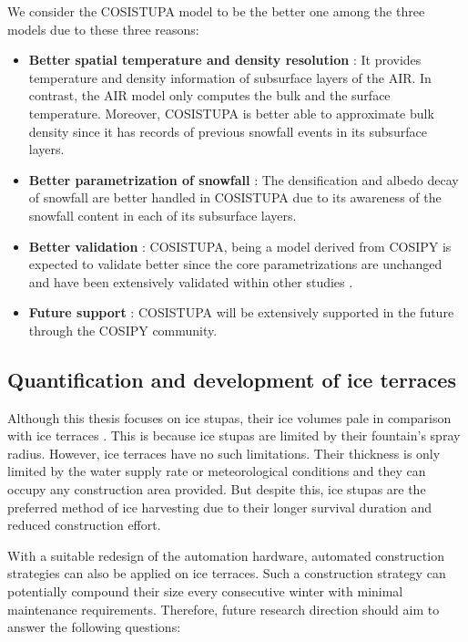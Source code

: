 We consider the COSISTUPA model to be the better one among the three models due to these three reasons:

\begin{itemize}

	\item \textbf{Better spatial temperature and density resolution} : It provides temperature and density
	      information of subsurface layers of the AIR. In contrast, the AIR model only computes the bulk and the
	      surface temperature. Moreover, COSISTUPA is better able to approximate bulk density since it has records of
	      previous snowfall events in its subsurface layers.

	\item \textbf{Better parametrization of snowfall} : The densification and albedo decay of snowfall are better
	      handled in COSISTUPA due to its awareness of the snowfall content in each of its subsurface layers.

	\item \textbf{Better validation} : COSISTUPA, being a model derived from COSIPY is expected to validate better
	      since the core parametrizations are unchanged and have been extensively validated within other studies \citep{arndtAtmosphereDrivenMassBalance2021}.

	\item \textbf{Future support} : COSISTUPA will be extensively supported in the future through the COSIPY
	      community.

\end{itemize}

\subsection{Quantification and development of ice terraces}

Although this thesis focuses on ice stupas, their ice volumes pale in comparison with ice terraces
\citep{nusserSociohydrologyArtificialGlaciers2019}. This is because ice stupas are limited by their fountain's
spray radius. However, ice terraces have no such limitations. Their thickness is only limited by the water
supply rate or meteorological conditions and they can occupy any construction area provided. But despite this, ice
stupas are the preferred method of ice harvesting due to their longer survival duration and reduced construction
effort.

With a suitable redesign of the automation hardware, automated construction strategies can also be applied on
ice terraces. Such a construction strategy can potentially compound their size every consecutive winter with
minimal maintenance requirements. Therefore, future research direction should aim to answer the following
questions:


